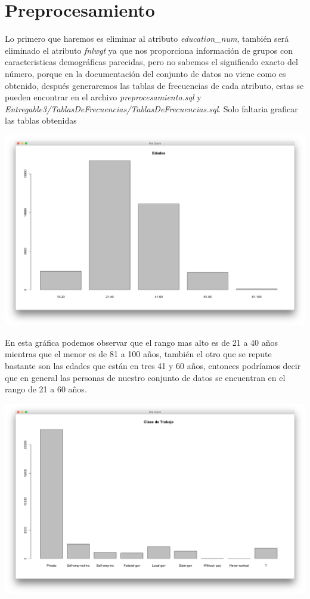 \documentclass{article}
\begin{document}
\section{Preprocesamiento}
  Lo primero que haremos es eliminar al atributo {\it education\_num}, también será eliminado el atributo {\it fnlwgt} ya que nos proporciona información de grupos con caracteristicas demográficas parecidas, pero no sabemos el significado exacto del número, porque en la documentación del conjunto de datos no viene como es obtenido, después generaremos las tablas de frecuencias de cada atributo, estas se pueden encontrar en el archivo {\it preprocesamiento.sql} y {\it Entregable3/TablasDeFrecuencias/TablasDeFrecuencias.sql}. Solo faltaria graficar las tablas obtenidas
  \begin{center}
    \hbox{\hspace{-5.5em}\includegraphics[scale=0.4]{graficas/edadesP}}
  \end{center}
  En esta gráfica podemos observar que el rango mas alto es de 21 a 40 años mientras que el menor es de 81 a 100 años, también el otro que se repute bastante son las edades que están en tres 41 y 60 años, entonces podríamos decir que en general las personas de nuestro conjunto de datos se encuentran en el rango de 21 a 60 años.
  \begin{center}
    \hbox{\hspace{-5.5em}\includegraphics[scale=0.4]{graficas/workclassP}}
  \end{center}
\end{document}
